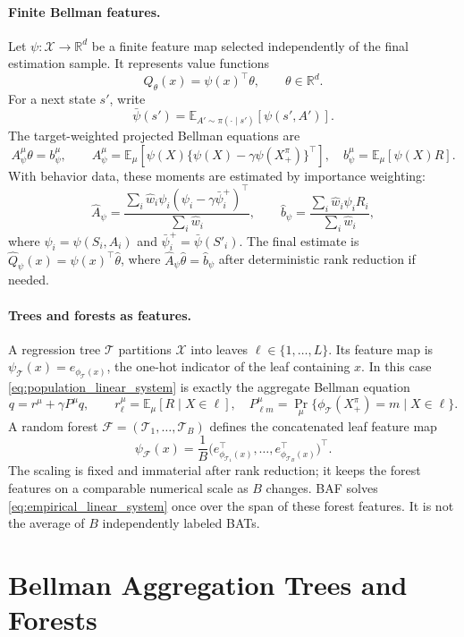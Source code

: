 \documentclass{article}
\newcommand{\E}{\mathbb{E}}
\newcommand{\R}{\mathbb{R}}
\newcommand{\cX}{\mathcal X}
\newcommand{\cT}{\mathcal T}
\newcommand{\cF}{\mathcal F}
\newcommand{\hatA}{\widehat A}
\newcommand{\hatb}{\widehat b}
\theoremstyle{plain}
\theoremstyle{definition}
\theoremstyle{remark}
\begin{document}
\paragraph{Finite Bellman features.}
Let \(\psi:\cX\to\R^d\) be a finite feature map selected independently of the
final estimation sample. It represents value functions
\[
  Q_\theta(x)=\psi(x)^\top\theta,\qquad \theta\in\R^d.
\]
For a next state \(s'\), write
\[
  \bar\psi(s')=\E_{A'\sim\pi(\cdot\mid s')}[\psi(s',A')].
\]
The target-weighted projected Bellman equations are
\[
  A^\mu_\psi\theta=b^\mu_\psi,\qquad
  A^\mu_\psi
  =
  \E_\mu\!\left[\psi(X)\{\psi(X)-\gamma\psi(X^\pi_+)\}^\top\right],
  \quad
  b^\mu_\psi
  =
  \E_\mu[\psi(X)R].
  \label{eq:population_linear_system}
\]
With behavior data, these moments are estimated by importance weighting:
\[
  \hatA_\psi
  =
  \frac{\sum_i \hat w_i\psi_i(\psi_i-\gamma\bar\psi_i^+)^\top}
       {\sum_i\hat w_i},
  \qquad
  \hatb_\psi
  =
  \frac{\sum_i\hat w_i\psi_i R_i}{\sum_i\hat w_i},
  \label{eq:empirical_linear_system}
\]
where \(\psi_i=\psi(S_i,A_i)\) and
\(\bar\psi_i^+=\bar\psi(S'_i)\). The final estimate is
\(\hat Q_\psi(x)=\psi(x)^\top\hat\theta\), where
\(\hatA_\psi\hat\theta=\hatb_\psi\) after deterministic rank reduction if
needed.

\paragraph{Trees and forests as features.}
A regression tree \(\cT\) partitions \(\cX\) into leaves
\(\ell\in\{1,\ldots,L\}\). Its feature map is
\(\psi_{\cT}(x)=e_{\phi_{\cT}(x)}\), the one-hot indicator of the leaf
containing \(x\). In this case \eqref{eq:population_linear_system} is exactly
the aggregate Bellman equation
\[
  q=r^\mu+\gamma P^\mu q,
  \qquad
  r^\mu_\ell=\E_\mu[R\mid X\in\ell],
  \quad
  P^\mu_{\ell m}=\Pr_\mu\{\phi_{\cT}(X^\pi_+)=m\mid X\in\ell\}.
\]
A random forest \(\cF=(\cT_1,\ldots,\cT_B)\) defines the concatenated leaf
feature map
\[
  \psi_{\cF}(x)
  =
  \frac{1}{B}\big(e_{\phi_{\cT_1}(x)}^\top,\ldots,
  e_{\phi_{\cT_B}(x)}^\top\big)^\top .
\]
The scaling is fixed and immaterial after rank reduction; it keeps the forest
features on a comparable numerical scale as \(B\) changes. BAF solves
\eqref{eq:empirical_linear_system} once over the span of these forest
features. It is not the average of \(B\) independently labeled BATs.

\section{Bellman Aggregation Trees and Forests}
\label{sec:method}
\end{document}
